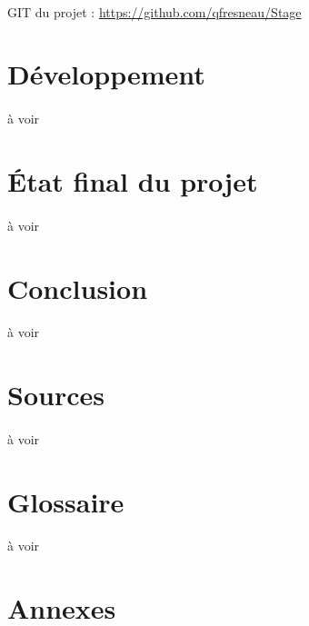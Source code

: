 \documentclass[a4paper,12pt]{extarticle}
\begin{document}
\paragraph{}
GIT du projet :
\url{https://github.com/qfresneau/Stage}\\

\clearpage

\section{Développement}

\paragraph{}
à voir\\

\clearpage

\section{État final du projet}

\paragraph{}
à voir\\

\clearpage

\section{Conclusion}

\paragraph{}
à voir\\

\clearpage

\section{Sources}

\paragraph{}
à voir\\

\section{Glossaire}

\paragraph{}
à voir\\

\clearpage

\section{Annexes}

\begin{center}
\end{center}
\end{document}
